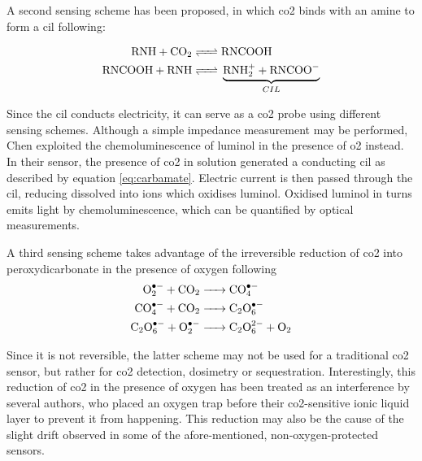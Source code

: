 A second sensing scheme has been proposed, in which \gls{co2} binds with an amine to form a \gls{cil} following\cite{chen2011}:

\begin{equation}\label{eq:carbamate}
	\begin{aligned}
		\ce{RNH + CO_2 &<=> RNCOOH} \\
		\ce{RNCOOH + RNH} &\ce{<=>} \underbrace{\ce{RNH^+_2 + RNCOO^-}}_{CIL}
	\end{aligned}
\end{equation}

Since the \gls{cil} conducts electricity, it can serve as a \gls{co2} probe using different sensing schemes. Although a simple impedance measurement may be performed, Chen \etal{}\cite{chen2011} exploited the chemoluminescence of luminol in the presence of \gls{o2} instead. In their sensor, the presence of \gls{co2} in solution generated a conducting \gls{cil} as described by equation \ref{eq:carbamate}. Electric current is then passed through the \gls{cil}, reducing dissolved  into  ions which oxidises luminol. Oxidised luminol in turns emits light by chemoluminescence, which can be quantified by optical measurements.

A third sensing scheme takes advantage of the irreversible reduction of \gls{co2} into peroxydicarbonate in the presence of oxygen following\cite{buzzeo2004, xiao2013}
\begin{equation}
	\begin{aligned}
		\ce{O^{.-}_2 + CO_2 &-> CO^{. -}_4 } \\
		\ce{CO^{.-}_4 + CO_2 &-> C_2O^{. -}_6 } \\
		\ce{C_2O^{.-}_6 + O^{. -}_2 &-> C_2O^{2-}_6 + O_2}
	\end{aligned}
\end{equation}

Since it is not reversible, the latter scheme may not be used for a traditional \gls{co2} sensor, but rather for \gls{co2} detection, dosimetry or sequestration. Interestingly, this reduction of \gls{co2} in the presence of oxygen has been treated as an interference by several authors\cite{revsbech2019, fapyane2020}, who placed an oxygen trap before their \gls{co2}-sensitive ionic liquid layer to prevent it from happening. This reduction may also be the cause of the slight drift observed in some of the afore-mentioned, non-oxygen-protected sensors\cite{li2012, willa2015, willa2017}.

